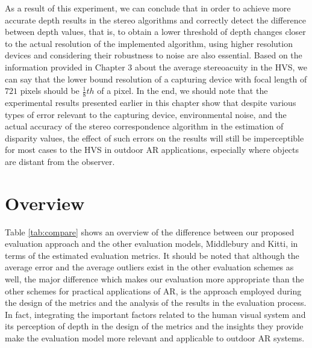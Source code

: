 As a result of this experiment, we can conclude that in order to achieve 
more accurate depth results in the stereo algorithms 
and correctly detect the difference between depth values, that is, to obtain a lower 
threshold of depth changes
closer to the actual resolution of the implemented algorithm, using higher resolution devices and considering their robustness to noise are also essential.
Based on the information provided in Chapter 3 about the average stereoacuity in the HVS, we can say that the lower bound resolution of a capturing device with focal length of $721$ pixels should be $\frac{1}{8}th$ of a pixel.
In the end, we should note that the experimental results presented earlier in this chapter
show that despite various types of error relevant to the capturing device, environmental noise, and the actual accuracy of the stereo correspondence algorithm
in the estimation of disparity values, the effect of such errors on the results will still be imperceptible for most cases to the HVS in outdoor 
AR applications,
especially where objects are distant from the observer.

\section{Overview}
Table \ref{tab:compare} shows an overview of the difference between our proposed evaluation approach and the other evaluation models, Middlebury
and Kitti, in terms of the estimated evaluation metrics. \newline
It should be noted that although the average error and the average outliers exist in the other evaluation schemes as well, the major
difference which makes our evaluation more appropriate than the other schemes for practical applications of AR,
is the approach employed during the design of the metrics and the analysis of the results in the evaluation process. In fact, integrating the 
important factors related to the human visual system and its
perception of depth in the design of the metrics and the insights they provide make the evaluation model more relevant and applicable to outdoor AR systems. \newline

